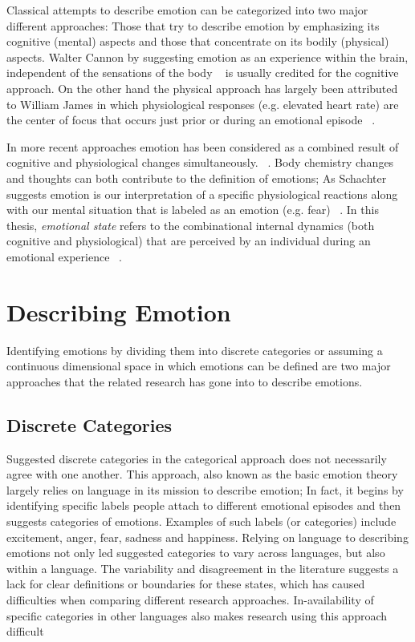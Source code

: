 \documentclass{uofsthesis-cs}
\begin{document}
Classical attempts to describe emotion can be categorized into two major different approaches: Those that try to describe emotion by emphasizing its cognitive (mental) aspects and those that concentrate on its bodily (physical) aspects. Walter Cannon by suggesting emotion as an experience within the brain, independent of the sensations of the body ~\cite{cannon1927james} is usually credited for the cognitive approach. On the other hand the physical approach has largely been attributed to William James in which physiological responses (e.g. elevated heart rate) are the center of focus that occurs just prior or during an emotional episode ~\cite{paiva2007affective}.

In more recent approaches emotion has been considered as a combined result of cognitive and physiological changes simultaneously. ~\cite{paiva2007affective}. Body chemistry changes and thoughts can both contribute to the definition of emotions; As Schachter suggests emotion is our interpretation of a specific physiological reactions along with our mental situation that is labeled as an emotion (e.g. fear) ~\cite{schachter1964interaction}. In this thesis, \textit{emotional state} refers to the combinational internal dynamics (both cognitive and physiological) that are perceived by an individual during an emotional experience ~\cite{paiva2007affective}.

\section{Describing Emotion}

Identifying emotions by dividing them into discrete categories or assuming a continuous dimensional space in which emotions can be defined are two major approaches that the related research has gone into to describe emotions.

\subsection{Discrete Categories}

Suggested discrete categories in the categorical approach does not necessarily agree with one another. This approach, also known as the basic emotion theory largely relies on language in its mission to describe emotion; In fact, it begins by identifying specific labels people attach to different emotional episodes and then suggests categories of emotions. Examples of such labels (or categories) include excitement, anger, fear, sadness and happiness. Relying on language to describing emotions not only led suggested categories to vary across languages, but also within a language. The variability and disagreement in the literature suggests a lack for clear definitions or boundaries for these states, which has caused difficulties when comparing different research approaches. In-availability of specific categories in other languages also makes research using this approach difficult ~\cite{zimmermann2006extending}
\end{document}
